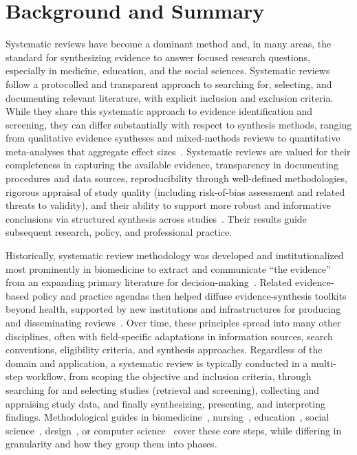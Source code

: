 \section*{Background and Summary}

Systematic reviews have become a dominant method and, in many areas, the standard for synthesizing evidence to answer focused research questions, especially in medicine, education, and the social sciences. Systematic reviews follow a protocolled and transparent approach to searching for, selecting, and documenting relevant literature, with explicit inclusion and exclusion criteria. While they share this systematic approach to evidence identification and screening, they can differ substantially with respect to synthesis methods, ranging from qualitative evidence syntheses and mixed-methods reviews to quantitative meta-analyses that aggregate effect sizes~\cite{gough:2012}. Systematic reviews are valued for their completeness in capturing the available evidence, transparency in documenting procedures and data sources, reproducibility through well-defined methodologies, rigorous appraisal of study quality (including risk-of-bias assessment and related threats to validity), and their ability to support more robust and informative conclusions via structured synthesis across studies~\cite{liberati:2009, mulrow:1994}. Their results guide subsequent research, policy, and professional practice.

Historically, systematic review methodology was developed and institutionalized most prominently in biomedicine to extract and communicate ``the evidence'' from an expanding primary literature for decision-making~\cite{chalmers:1993, guyatt:1992}. Related evidence-based policy and practice agendas then helped diffuse evidence-synthesis toolkits beyond health, supported by new institutions and infrastructures for producing and disseminating reviews~\cite{simons:2021}. Over time, these principles spread into many other disciplines, often with field-specific adaptations in information sources, search conventions, eligibility criteria, and synthesis approaches. Regardless of the domain and application, a systematic review is typically conducted in a multi-step workflow, from scoping the objective and inclusion criteria, through searching for and selecting studies (retrieval and screening), collecting and appraising study data, and finally synthesizing, presenting, and interpreting findings. Methodological guides in biomedicine~\cite{chandler_cochrane_2019}, nursing~\cite{bettany_saltikov_how_2012}, education~\cite{newman_systematic_2020}, social science~\cite{petticrew_systematic_2008}, design~\cite{lame:2019}, or computer science~\cite{kitchenham:2004} cover these core steps, while differing in granularity and how they group them into phases.

